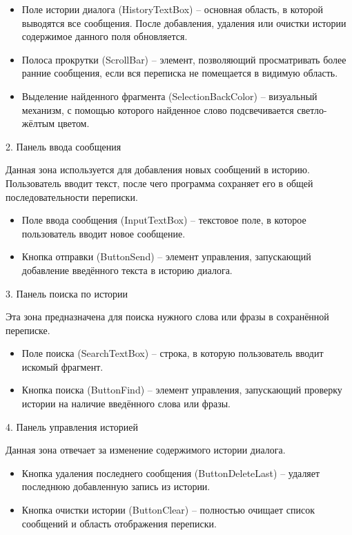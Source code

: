 \documentclass[12pt,a4paper]{article}
\begin{document}
\begin{itemize}
  \item Поле истории диалога (HistoryTextBox) -- основная область, в которой выводятся все сообщения. После добавления, удаления или очистки истории содержимое данного поля обновляется.
  \item Полоса прокрутки (ScrollBar) -- элемент, позволяющий просматривать более ранние сообщения, если вся переписка не помещается в видимую область.
  \item Выделение найденного фрагмента (SelectionBackColor) -- визуальный механизм, с помощью которого найденное слово подсвечивается светло-жёлтым цветом.
\end{itemize}

2. Панель ввода сообщения

Данная зона используется для добавления новых сообщений в историю. Пользователь вводит текст, после чего программа сохраняет его в общей последовательности переписки.

\begin{itemize}
  \item Поле ввода сообщения (InputTextBox) -- текстовое поле, в которое пользователь вводит новое сообщение.
  \item Кнопка отправки (ButtonSend) -- элемент управления, запускающий добавление введённого текста в историю диалога.
\end{itemize}

3. Панель поиска по истории

Эта зона предназначена для поиска нужного слова или фразы в сохранённой переписке.

\begin{itemize}
  \item Поле поиска (SearchTextBox) -- строка, в которую пользователь вводит искомый фрагмент.
  \item Кнопка поиска (ButtonFind) -- элемент управления, запускающий проверку истории на наличие введённого слова или фразы.
\end{itemize}

4. Панель управления историей

Данная зона отвечает за изменение содержимого истории диалога.

\begin{itemize}
  \item Кнопка удаления последнего сообщения (ButtonDeleteLast) -- удаляет последнюю добавленную запись из истории.
  \item Кнопка очистки истории (ButtonClear) -- полностью очищает список сообщений и область отображения переписки.
\end{itemize}
\end{document}
